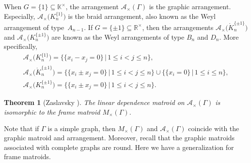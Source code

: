 \documentclass[pdftex]{sigma}
\numberwithin{equation}{section}
\newtheorem{Theorem}{Theorem}[section]
\begin{document}
\begin{Example}
When $ G = \{1\} \subseteq \mathbb{K}^{\times} $, the arrangement $ \mathcal{A}_{\times}(\Gamma) $ is the graphic arrangement.
Especially, $ \mathcal{A}_{\times}\big(K_{n}^{\{1\}}\big) $ is the braid arrangement, also known as the Weyl arrangement of type~$ A_{n-1} $.
If $ G = \{\pm 1\} \subseteq \mathbb{R}^{\times} $, then the arrangements $ \mathcal{A}_{\times}\big(\mathring{K}_{n}^{\{\pm 1\}}\big) $ and $ \mathcal{A}_{\times}\big(K_{n}^{\{\pm 1\}}\big) $ are known as the Weyl arrangements of type $ B_{n} $ and $ D_{n} $.
More specifically,
\begin{gather*}
\mathcal{A}_{\times}\big(K_{n}^{\{1\}}\big) = \{\{x_{i}-x_{j}=0\} \,|\, 1 \leq i < j \leq n\}, \\
\mathcal{A}_{\times}\big(\mathring{K}_{n}^{\{\pm 1\}}\big) = \{\{x_{i} \pm x_{j}=0\} \,|\, 1 \leq i < j \leq n\} \cup \{\{x_{i}=0\} \,|\, 1 \leq i \leq n\}, \\
\mathcal{A}_{\times}\big(K_{n}^{\{\pm 1\}}\big) = \{\{x_{i} \pm x_{j}=0\} \,|\, 1 \leq i < j \leq n\}.
\end{gather*}
\end{Example}

\begin{Theorem}[{Zaslavsky \cite[Theorem~2.1(a)]{zaslavsky2003biased-joctsb}}]\label{Zaslavsky frame arrangement}
The linear dependence matroid on $ \mathcal{A}_{\times}(\Gamma) $ is isomorphic to the frame matroid $ M_{\times}(\Gamma) $.
\end{Theorem}

Note that if $ \Gamma $ is a simple graph, then $ M_{\times}(\Gamma) $ and $ \mathcal{A}_{\times}(\Gamma) $ coincide with the graphic matroid and arrangement. Moreover, recall that the graphic matroids associated with complete graphs are round.
Here we have a generalization for frame matroids.
\end{document}
